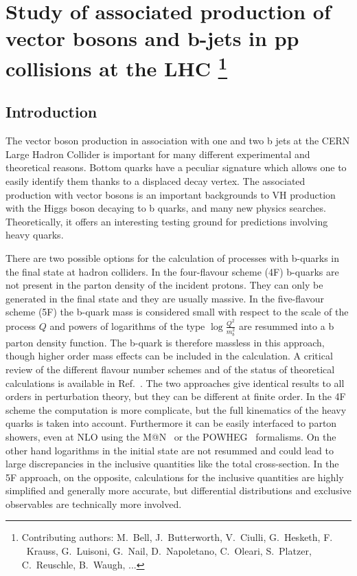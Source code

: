 \documentclass[11pt]{cernrep}
\makeatletter
\newcommand{\MCatNLO}{M\protect\scalebox{0.8}{C}@N\protect\scalebox{0.8}{LO}\xspace}
\makeatother
\begin{document}
\section{Study of associated production of vector bosons and b-jets in
  pp collisions at the LHC \protect\footnote{Contributing authors:
    M.~Bell, J.~Butterworth,  V.~Ciulli,
    G.~Hesketh, F. ~Krauss, G.~Luisoni, G.~Nail, D.~Napoletano,
    C.~Oleari, S.~Platzer, C.~Reuschle, B.~Waugh, ... }}

\subsection{Introduction}

The vector boson production in association with one and two b jets at the
CERN Large Hadron Collider is important for many different experimental and
theoretical reasons. Bottom quarks have a peculiar signature which allows one
to easily identify them thanks to a displaced decay vertex. The associated
production with vector bosons is an important backgrounds to VH production
with the Higgs boson decaying to b quarks, and many new physics
searches. Theoretically, it offers an interesting testing ground for
predictions involving heavy quarks.

There are two possible options for the calculation of processes with b-quarks
in the final state at hadron colliders. In the four-flavour scheme (4F)
b-quarks are not present in the parton density of the incident protons. They
can only be generated in the final state and they are usually massive. In the
five-flavour scheme (5F) the b-quark mass is considered small with respect to
the scale of the process $Q$ and powers of logarithms of the type
$\log\frac{Q^2}{m_b^2}$ are resummed into a b parton density function. The
b-quark is therefore massless in this approach, though higher order mass
effects can be included in the calculation. A critical review of the
different flavour number schemes and of the status of theoretical
calculations is available in Ref.~\cite{Maltoni:2012pa}. The two approaches
give identical results to all orders in perturbation theory, but they can be
different at finite order. In the 4F scheme the computation is more
complicate, but the full kinematics of the heavy quarks is taken into
account. Furthermore it can be easily interfaced to parton showers, even at
NLO using the \MCatNLO~\cite{Frixione:2002ik} or the
POWHEG~\cite{Nason:2004rx} formalisms.  On the other hand logarithms in the
initial state are not resummed and could lead to large discrepancies in the
inclusive quantities like the total cross-section. In the 5F approach, on the
opposite, calculations for the inclusive quantities are highly simplified and
generally more accurate, but differential distributions and exclusive
observables are technically more involved.
\end{document}
